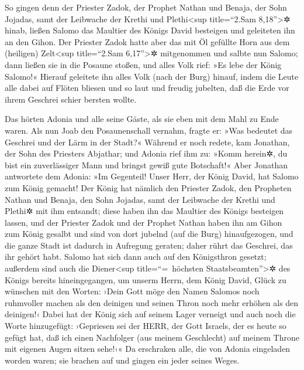 So gingen denn der Priester Zadok, der Prophet Nathan und
Benaja, der Sohn Jojadas, samt der Leibwache der Krethi und
Plethi\textless sup title=``2.Sam 8,18''\textgreater✲ hinab, ließen
Salomo das Maultier des Königs David besteigen und geleiteten ihn an den
Gihon. Der Priester Zadok hatte aber das mit Öl gefüllte
Horn aus dem (heiligen) Zelt\textless sup title=``2.Sam
6,17''\textgreater✲ mitgenommen und salbte nun Salomo; dann ließen sie
in die Posaune stoßen, und alles Volk rief: »Es lebe der König Salomo!«
Hierauf geleitete ihn alles Volk (nach der Burg) hinauf,
indem die Leute alle dabei auf Flöten bliesen und so laut und freudig
jubelten, daß die Erde vor ihrem Geschrei schier bersten wollte.

Das hörten Adonia und alle seine Gäste, als sie eben mit
dem Mahl zu Ende waren. Als nun Joab den Posaunenschall vernahm, fragte
er: »Was bedeutet das Geschrei und der Lärm in der Stadt?«
Während er noch redete, kam Jonathan, der Sohn des
Priesters Abjathar; und Adonia rief ihm zu: »Komm herein✲, du bist ein
zuverlässiger Mann und bringst gewiß gute Botschaft!«
Aber Jonathan antwortete dem Adonia: »Im Gegenteil! Unser
Herr, der König David, hat Salomo zum König gemacht! Der
König hat nämlich den Priester Zadok, den Propheten Nathan und Benaja,
den Sohn Jojadas, samt der Leibwache der Krethi und Plethi✲ mit ihm
entsandt; diese haben ihn das Maultier des Königs besteigen lassen,
und der Priester Zadok und der Prophet Nathan haben ihn
am Gihon zum König gesalbt und sind von dort jubelnd (auf die Burg)
hinaufgezogen, und die ganze Stadt ist dadurch in Aufregung geraten;
daher rührt das Geschrei, das ihr gehört habt. Salomo hat
sich dann auch auf den Königsthron gesetzt; außerdem sind
auch die Diener\textless sup title=``=~höchsten
Staatsbeamten''\textgreater✲ des Königs bereits hineingegangen, um
unserm Herrn, dem König David, Glück zu wünschen mit den Worten: ›Dein
Gott möge den Namen Salomos noch ruhmvoller machen als den deinigen und
seinen Thron noch mehr erhöhen als den deinigen!‹ Dabei hat der König
sich auf seinem Lager verneigt und auch noch die Worte
hinzugefügt: ›Gepriesen sei der HERR, der Gott Israels, der es heute so
gefügt hat, daß ich einen Nachfolger (aus meinem Geschlecht) auf meinem
Throne mit eigenen Augen sitzen sehe!‹« Da erschraken
alle, die von Adonia eingeladen worden waren; sie brachen auf und gingen
ein jeder seines Weges.


